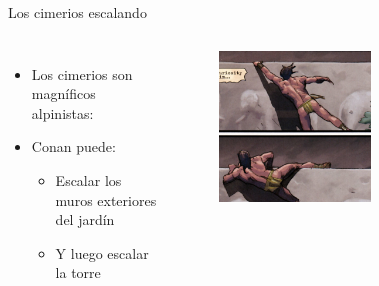 \begin{frame}{Los cimerios escalando}
  \begin{columns}
    \begin{itemize}
      \item Los cimerios son magníficos alpinistas:
      \item Conan puede:
      \begin{itemize}
        \item Escalar los muros exteriores del jardín
        \item Y luego escalar la torre
      \end{itemize}
    \end{itemize}
    \begin{figure}[htb]
      \centering
      \includegraphics[width=0.6\textwidth]{img/tropes/escalando}
    \end{figure}
  \end{columns}
\end{frame}

